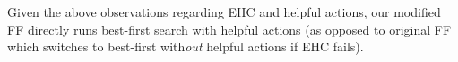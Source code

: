 Given the above observations regarding EHC and helpful actions, our
modified FF directly runs best-first search with helpful actions (as
opposed to original FF which switches to best-first with{\em out}
helpful actions if EHC fails).










